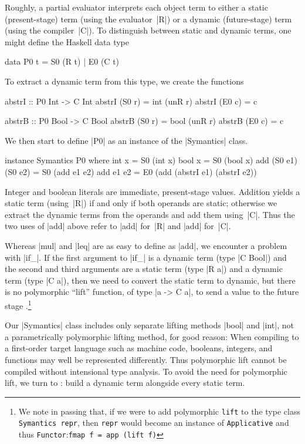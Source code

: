 \documentclass[preprint]{sigplanconf}
\begin{document}
Roughly, a partial evaluator interprets each object term to either
a static (present-stage) term (using the evaluator~|R|) or
a dynamic (future-stage) term (using the compiler~|C|).  To
distinguish between static and dynamic terms, one might define
the Haskell data type
\begin{code}
data P0 t = S0 (R t) | E0 (C t)
\end{code}
To extract a dynamic term from this type, we create the functions
\begin{code}
abstrI :: P0 Int -> C Int
abstrI (S0 r) = int (unR r)
abstrI (E0 c) = c

abstrB :: P0 Bool -> C Bool
abstrB (S0 r) = bool (unR r)
abstrB (E0 c) = c
\end{code}
We then start to define |P0| as an instance of the |Symantics| class.
\begin{code}
instance Symantics P0 where
  int  x = S0 (int x)
  bool x = S0 (bool x)
  add (S0 e1) (S0 e2) = S0 (add e1 e2)
  add e1 e2 = E0 (add (abstrI e1) (abstrI e2))
\end{code}
Integer and boolean literals are immediate, present-stage
values. Addition yields a static term (using~|R|) if and only if both operands
are static; otherwise we extract the dynamic terms from the operands and
add them using~|C|.  Thus the two uses of |add| above refer to
|add| for~|R| and |add| for~|C|.

Whereas |mul| and |leq| are as easy to define as |add|, we encounter
a problem with |if_|.  If the first argument to |if_| is a dynamic term
(type |C Bool|) and the second and third arguments are a static term
(type |R a|) and a dynamic term (type |C a|), then we need to convert
the static term to dynamic, but there is no polymorphic ``lift''
function, of type |a -> C a|, to send a value to the future stage
\citep{xi-guarded,WalidPOPL03}.\footnote{We note in passing that, if we
were to add polymorphic \texttt{lift} to the type class
\texttt{Symantics repr}, then \texttt{repr} would become an instance of
\texttt{Applicative} and thus \texttt{Functor}:\quad\texttt{fmap
f = app (lift f)}}

Our |Symantics| class includes only separate lifting methods |bool| and
|int|, not a parametrically polymorphic lifting method, for good reason:
When compiling to a first-order target language such as machine code,
booleans, integers, and functions may well be represented differently.
Thus polymorphic lift cannot be compiled without intensional type
analysis.  To avoid the need for polymorphic lift, we turn to
\citet[see also \citealp{sumii-hybrid}]{asai-binding-time}:
build a dynamic term
alongside every static term.
\end{document}
